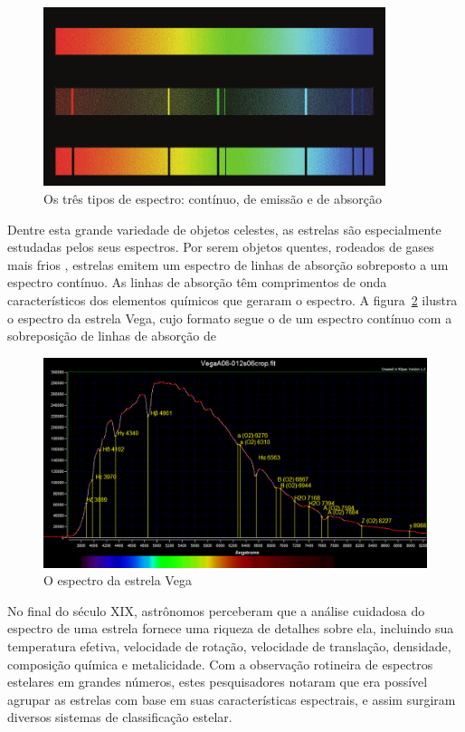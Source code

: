 \begin{figure}[htb]
\centering
\includegraphics[width=10cm]{figuras/Continuous-spectrum-and-two-types-of-line-spectra.png}
\caption{Os três tipos de espectro: contínuo, de emissão e de absorção \citep{mcgrawhill}}
\label{fig:spectrum-types}
\end{figure}

Dentre esta grande variedade de objetos celestes, as estrelas são especialmente estudadas pelos seus espectros. Por serem objetos quentes, rodeados de gases mais frios , estrelas emitem um espectro de linhas de absorção sobreposto a um espectro contínuo. As linhas de absorção têm comprimentos de onda característicos dos elementos químicos que geraram o espectro. A figura~\ref{fig:vega-spectrum} ilustra o espectro da estrela Vega, cujo formato segue o de um espectro contínuo com a sobreposição de linhas de absorção de %

\begin{figure}[htb]
\centering
\includegraphics[width=12cm]{figuras/vega_spectrum.jpg}
\caption{O espectro da estrela Vega\citep{vega-spectrum}}
\label{fig:vega-spectrum}
\end{figure}

No final do século XIX, astrônomos perceberam que a análise cuidadosa do espectro de uma estrela fornece uma riqueza de detalhes sobre ela, incluindo sua temperatura efetiva, velocidade de rotação, velocidade de translação, densidade, composição química e metalicidade. Com a observação rotineira de espectros estelares em grandes números, estes pesquisadores notaram que era possível agrupar as estrelas com base em suas características espectrais, e assim surgiram diversos sistemas de classificação estelar. 

